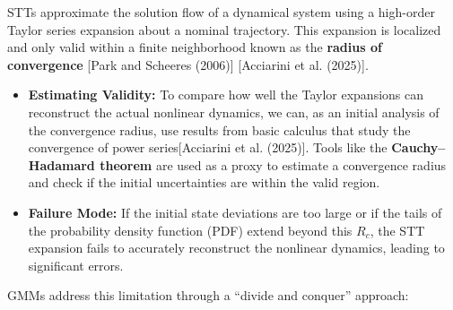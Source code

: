 \documentclass[
  letterpaper,
  DIV=11,
  numbers=noendperiod,
  oneside]{scrartcl}
\providecommand{\tightlist}{%
  \setlength{\itemsep}{0pt}\setlength{\parskip}{0pt}}
\begin{document}
STTs approximate the solution flow of a dynamical system using a
high-order Taylor series expansion about a nominal trajectory. This
expansion is localized and only valid within a finite neighborhood known
as the \textbf{radius of convergence} {[}Park and Scheeres (2006){]}
{[}Acciarini et al. (2025){]}.

\begin{itemize}
\tightlist
\item
  \textbf{Estimating Validity:} To compare how well the Taylor
  expansions can reconstruct the actual nonlinear dynamics, we can, as
  an initial analysis of the convergence radius, use results from basic
  calculus that study the convergence of power series{[}Acciarini et al.
  (2025){]}. Tools like the \textbf{Cauchy--Hadamard theorem} are used
  as a proxy to estimate a convergence radius and check if the initial
  uncertainties are within the valid region.
\end{itemize}


\begin{itemize}
\tightlist
\item
  \textbf{Failure Mode:} If the initial state deviations are too large
  or if the tails of the probability density function (PDF) extend
  beyond this \(R_c\), the STT expansion fails to accurately reconstruct
  the nonlinear dynamics, leading to significant errors.
\end{itemize}

GMMs address this limitation through a ``divide and conquer'' approach:
\end{document}
